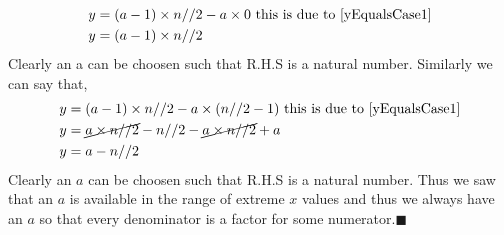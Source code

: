 \documentclass[10pt, twoside]{article}
\begin{document}
\begin{align*}
	y &= (a-1)\times n//2 - a\times 0 \text{ this is due to \eqref{yEqualsCase1}} \\
	y &= (a-1)\times n//2
\end{align*}
Clearly an a can be choosen such that R.H.S is a natural number. Similarly we can say that,
\begin{align*}
	y &= (a-1)\times n//2 - a\times (n//2-1) \text{ this is due to \eqref{yEqualsCase1}} \\
	y &= \cancel{a\times n//2} - n//2 -\cancel{a\times n//2} +a \\	
	y &= a - n//2
\end{align*}
Clearly an \textbf{$a$} can be choosen such that R.H.S is a natural number. Thus we saw that an $a$ is available in the range of extreme $x$ values and thus we always have an \textbf{$a$} so that every denominator is a factor for some numerator.$\blacksquare$
\end{document}
